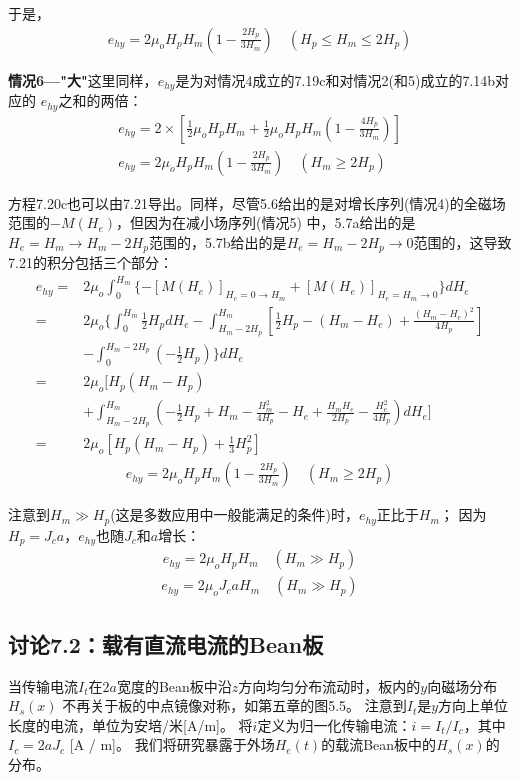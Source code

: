 于是，
\begin{align*}
e_{hy}=2\mu_oH_pH_m\left(1-\frac{2H_p}{3H_m}\right)\quad (H_p\leq H_m\leq 2H_p) \tag{7.20b}
\end{align*}

\textbf{情况6---"大"}\quad 这里同样，$e_{hy}$是为对情况4成立的7.19c和对情况2(和5)成立的7.14b对应的
$e_{hy}$之和的两倍：
\begin{align*}%
e_{hy}=2\times\left[\frac{1}{2}\mu_oH_pH_m+\frac{1}{2}\mu_oH_pH_m\left(1-\frac{4H_p}{3H_m}\right)\right]\\
e_{hy}=2\mu_oH_pH_m\left(1-\frac{2H_p}{3H_m}\right) \quad (H_m\geq 2H_p) \tag{7.20c}
\end{align*}

方程7.20c也可以由7.21导出。同样，尽管5.6给出的是对增长序列(情况4)的全磁场范围的$-M(H_e)$，但因为在减小场序列(情况5)
中，5.7a给出的是$H_e=H_m\rightarrow H_m-2H_p$范围的，5.7b给出的是$H_e=H_m-2H_p\rightarrow 0$范围的，这导致
7.21的积分包括三个部分：
\begin{align*}%
e_{hy}=&2\mu_o\int_{0}^{H_m}\{-[M(H_e)]_{H_e=0\rightarrow H_m}+[M(H_e)]_{H_e=H_m\rightarrow 0}\}dH_e \\\tag{7.21}
=&2\mu_o\Big\{\int_{0}^{H_m}\frac{1}{2}H_pdH_e 
-\int_{H_m-2H_p}^{H_m}\left[\frac{1}{2}H_p-(H_m-H_e)+\frac{(H_m-H_e)^2}{4H_p}\right]\\
&-\int_{0}^{H_m-2H_p}(-\frac{1}{2}H_p)\Big\}dH_e\\ 
=&2\mu_o\big[H_p(H_m-H_p)\\ 
&+\int_{H_m-2H_p}^{H_m}\left(-\frac{1}{2}H_p+H_m-\frac{H_{m}^{2}}{4H_p}-H_e+\frac{H_mH_e}{2H_p}-\frac{H_{e}^{2}}{4H_p}\right)dH_e\big] \\
=&2\mu_o[H_p(H_m-H_p)+\frac{1}{3}H_{p}^{2}]
\end{align*}
\begin{align*}
e_{hy}=2\mu_oH_pH_m\left(1-\frac{2H_p}{3H_m}\right)   \quad  (H_m\geq 2H_p) \tag{7.20c}
\end{align*}

注意到$H_m\gg H_p$(这是多数应用中一般能满足的条件)时，$e_{hy}$正比于$H_m$；
因为$H_p=J_c a$，$e_{hy}$也随$J_c$和$a$增长：
\begin{align*}%
e_{hy}=2\mu_oH_pH_m \quad  (H_m\gg H_p) \tag{7.20d}
\end{align*}
\begin{align*}
e_{hy}=2\mu_oJ_caH_m \quad (H_m\gg H_p) \tag{7.20e}
\end{align*}


\subsection{讨论7.2：载有直流电流的Bean板}
当传输电流$I_t$在$2a$宽度的Bean板中沿$z$方向均匀分布流动时，板内的$y$向磁场分布$H_s(x)$
不再关于板的中点镜像对称，如第五章的图5.5。
注意到$I_t$是$y$方向上单位长度的电流，单位为安培/米[A/m]。
将$i$定义为归一化传输电流：$i= I_t / I_c$，其中$I_c = 2a J_c$ [A / m]。 我们将研究暴露于外场$H_e(t)$的载流Bean板中的$H_s(x)$的分布。

